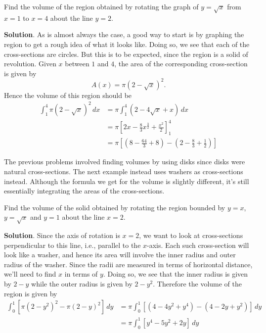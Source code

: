 \documentclass[10pt,]{book}
\theoremstyle{ptxplainnotitle}
\theoremstyle{ptxplaintitle}
\theoremstyle{ptxplainnotitle}
\theoremstyle{ptxplaintitle}
\theoremstyle{ptxplainnotitle}
\theoremstyle{ptxplaintitle}
\theoremstyle{ptxdefinitionnotitle}
\theoremstyle{ptxdefinitiontitle}
\theoremstyle{ptxdefinitionnotitle}
\theoremstyle{ptxdefinitiontitle}
\theoremstyle{ptxdefinitionnotitle}
\theoremstyle{ptxdefinitiontitle}
\theoremstyle{ptxdefinitionnotitle}
\theoremstyle{ptxdefinitiontitle}
\theoremstyle{ptxdefinitionnotitle}
\theoremstyle{ptxdefinitiontitle}
\numberwithin{equation}{section}
\newcommand{\amp}{&}
\begin{document}
\begin{example}\label{example-142}
\hypertarget{p-633}{}%
Find the volume of the region obtained by rotating the graph of \(y = \sqrt{x}\) from \(x = 1\) to \(x = 4\) about the line \(y = 2\).%
\par\smallskip%
\noindent\textbf{Solution}.\hypertarget{solution-138}{}\quad%
\hypertarget{p-634}{}%
As is almost always the case, a good way to start is by graphing the region to get a rough idea of what it looks like. Doing so, we see that each of the cross-sections are circles. But this is to be expected, since the region is a solid of revolution. Given \(x\) between \(1\) and \(4\), the area of the corresponding cross-section is given by%
\begin{equation*}
A(x) = \pi(2 - \sqrt{x})^{2}.
\end{equation*}
Hence the volume of this region should be%
\begin{align*}
\int_{1}^{4}\pi(2 - \sqrt{x})^{2}\,dx \amp= \pi\int_{1}^{4}(2 - 4\sqrt{x} + x)\,dx\\
\amp= \pi\left[2x - \frac{8}{3}x^{\frac{3}{2}} + \frac{x^{2}}{2}\right]_{1}^{4}\\
\amp= \pi\left[\left(8 - \frac{64}{3} + 8\right) - \left(2 - \frac{8}{3} + \frac{1}{2}\right)\right]
\end{align*}
%
\end{example}
\hypertarget{p-635}{}%
The previous problems involved finding volumes by using disks since disks were natural cross-sections. The next example instead uses washers as cross-sections instead. Although the formula we get for the volume is slightly different, it's still essentially integrating the areas of the cross-sections.%
\begin{example}\label{example-solid-rev-4}
\hypertarget{p-636}{}%
Find the volume of the solid obtained by rotating the region bounded by \(y = x\), \(y = \sqrt{x}\) and \(y = 1\) about the line \(x = 2\).%
\par\smallskip%
\noindent\textbf{Solution}.\hypertarget{solution-139}{}\quad%
\hypertarget{p-637}{}%
Since the axis of rotation is \(x = 2\), we want to look at cross-sections perpendicular to this line, i.e., parallel to the \(x\)-axis. Each such cross-section will look like a washer, and hence its area will involve the inner radius and outer radius of the washer. Since the radii are measured in terms of horizontal distance, we'll need to find \(x\) in terms of \(y\). Doing so, we see that the inner radius is given by \(2 - y\) while the outer radius is given by \(2 - y^{2}\). Therefore the volume of the region is given by%
\begin{align*}
\int_{0}^{1}\left[\pi(2 - y^{2})^{2} - \pi(2 - y)^{2}\right]\,dy \amp= \pi\int_{0}^{1}\left[(4 - 4y^{2} + y^{4}) - (4 - 2y + y^{2})\right]\,dy\\
\amp= \pi\int_{0}^{1}\left[y^{4} - 5y^{2} + 2y\right]\,dy
\end{align*}
%
\end{example}
\typeout{************************************************}
\typeout{************************************************}
\end{document}

